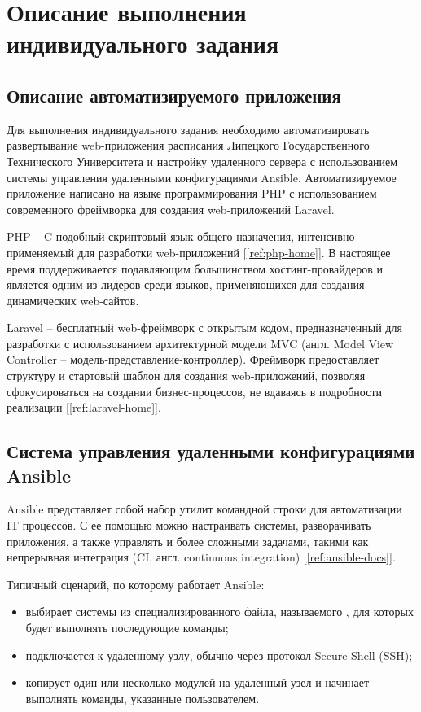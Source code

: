 \section{Описание выполнения индивидуального задания}
\subsection{Описание автоматизируемого приложения}
Для выполнения индивидуального задания необходимо автоматизировать развертывание
web-приложения расписания Липецкого Государственного Технического Университета и
настройку удаленного сервера с использованием системы управления удаленными
конфигурациями Ansible. Автоматизируемое приложение написано на языке
программирования PHP с использованием современного фреймворка для создания
web-приложений Laravel.

PHP -- C-подобный скриптовый язык общего назначения, интенсивно применяемый для
разработки web-приложений [\ref{ref:php-home}]. В настоящее время поддерживается
подавляющим большинством хостинг-провайдеров и является одним из лидеров среди
языков, применяющихся для создания динамических web-сайтов.

Laravel -- бесплатный web-фреймворк с открытым кодом, предназначенный для
разработки с использованием архитектурной модели MVC (англ. Model View
Controller -- модель-представление-контроллер). Фреймворк предоставляет
структуру и стартовый шаблон для создания web-приложений, позволяя
сфокусироваться на создании бизнес-процессов, не вдаваясь в подробности
реализации [\ref{ref:laravel-home}].

\subsection{Система управления удаленными конфигурациями Ansible}
Ansible представляет собой набор утилит командной строки для автоматизации
IT процессов. С ее помощью можно настраивать системы, разворачивать приложения,
а также управлять и более сложными задачами, такими как непрерывная интеграция
(CI, англ. continuous integration) [\ref{ref:ansible-docs}].

Типичный сценарий, по которому работает Ansible:
\begin{itemize}
    \item выбирает системы из специализированного файла, называемого
        , для которых будет выполнять последующие
        команды;
    \item подключается к удаленному узлу, обычно через протокол Secure Shell
        (SSH);
    \item копирует один или несколько модулей на удаленный узел и начинает
        выполнять команды, указанные пользователем.
\end{itemize}


